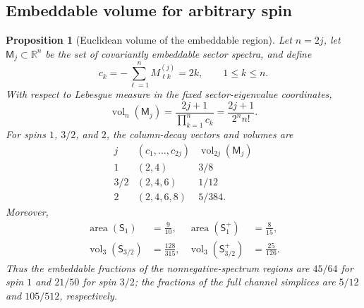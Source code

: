 \documentclass[twoside,10pt]{article}
\numberwithin{equation}{section}
\theoremstyle{slbody}
\newtheorem{proposition}[theorem]{Proposition}
\theoremstyle{definition}
\theoremstyle{remark}
\begin{document}
\subsection{Embeddable volume for arbitrary spin}

\begin{proposition}[Euclidean volume of the embeddable region]
\label{prop:embeddable-volume}
Let \(n=2j\), let \(\mathsf M_j\subset\mathbb R^n\) be the set of
covariantly embeddable sector spectra, and define
\begin{equation}\label{eq:column-decays}
 c_k=-\sum_{\ell=1}^nM^{(j)}_{\ell k}=2k,
 \qquad 1\leq k\leq n.
\end{equation}
With respect to Lebesgue measure in the fixed sector-eigenvalue
coordinates,
\begin{equation}\label{eq:general-embeddable-volume}
 \operatorname{vol}_n(\mathsf M_j)
 =\frac{2j+1}{\prod_{k=1}^nc_k}
 =\frac{2j+1}{2^n n!}.
\end{equation}
For spins \(1\), \(3/2\), and \(2\), the column-decay vectors and
volumes are
\begin{equation}\label{eq:low-spin-embeddable-volumes}
\begin{array}{c|c|c}
 j&(c_1,\ldots,c_{2j})&\operatorname{vol}_{2j}(\mathsf M_j)\\ \hline
 1&(2,4)&3/8\\
 3/2&(2,4,6)&1/12\\
 2&(2,4,6,8)&5/384.
\end{array}
\end{equation}
Moreover,
\begin{align}
 \operatorname{area}(\mathsf S_1)&=\frac9{10},
 &\operatorname{area}(\mathsf S_1^+)&=\frac8{15},            \label{eq:spin-one-comparison-volumes}\\
 \operatorname{vol}_3(\mathsf S_{3/2})&=\frac{128}{315},
 &\operatorname{vol}_3(\mathsf S_{3/2}^+)&=\frac{25}{126}.   \label{eq:spin-three-comparison-volumes}
\end{align}
Thus the embeddable fractions of the nonnegative-spectrum regions are
\(45/64\) for spin \(1\) and \(21/50\) for spin \(3/2\); the fractions
of the full channel simplices are \(5/12\) and \(105/512\),
respectively.
\end{proposition}
\end{document}
